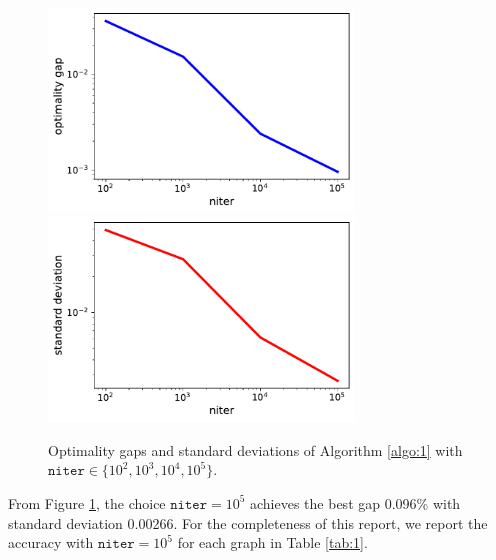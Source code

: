 \documentclass{article}
\begin{document}
\begin{figure}[htbp] %
   \centering
   \includegraphics[width=3.2in]{1.pdf}
   \includegraphics[width=3.2in]{2.pdf} 
   \caption{Optimality gaps and standard deviations of  Algorithm \ref{algo:1}  with  $\texttt{niter}\in \{10^2, 10^3, 10^4, 10^5\}$. }
   \label{fig:1}
\end{figure}

From Figure \ref{fig:1},  the choice $\texttt{niter}=10^5$ achieves the best  gap  0.096\% with standard deviation 0.00266.    For the completeness of  this report,   we report the accuracy  with $\texttt{niter}=10^5$ for each  graph in    Table \ref{tab:1}. 
\end{document}
